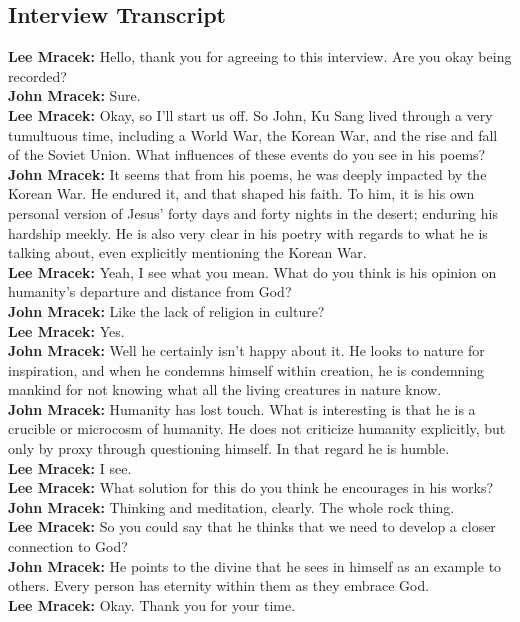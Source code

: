 \documentclass[12pt,letterpaper]{article}
\begin{document}
\begin{appendix}
    \section{Interview Transcript}
    \begin{subappendices}
\textbf{Lee Mracek:} Hello, thank you for agreeing to this interview. Are you okay being recorded? \\
\textbf{John Mracek:} Sure. \\
\textbf{Lee Mracek:} Okay, so I'll start us off. So John, Ku Sang lived through a very tumultuous time, including a World War, the Korean War, and the rise and fall of the Soviet Union. What influences of these events do you see in his poems?\\
\textbf{John Mracek:} It seems that from his poems, he was deeply impacted by the Korean War. He endured it, and that shaped his faith. To him, it is his own personal version of Jesus' forty days and forty nights in the desert; enduring his hardship meekly. He is also very clear in his poetry with regards to what he is talking about, even explicitly mentioning the Korean War.\\
\textbf{Lee Mracek:} Yeah, I see what you mean. What do you think is his opinion on humanity's departure and distance from God?\\
\textbf{John Mracek:} Like the lack of religion in culture? \\
\textbf{Lee Mracek:} Yes. \\
\textbf{John Mracek:} Well he certainly isn't happy about it. He looks to nature for inspiration, and when he condemns himself within creation, he is condemning mankind for not knowing what all the living creatures in nature know. \\
\textbf{John Mracek:} Humanity has lost touch. What is interesting is that he is a crucible or microcosm of humanity. He does not criticize humanity explicitly, but only by proxy through questioning himself. In that regard he is humble. \\
\textbf{Lee Mracek:} I see. \\
\textbf{Lee Mracek:} What solution for this do you think he encourages in his works? \\
\textbf{John Mracek:} Thinking and meditation, clearly. The whole rock thing. \\
\textbf{Lee Mracek:} So you could say that he thinks that we need to develop a closer connection to God? \\
\textbf{John Mracek:} He points to the divine that he sees in himself as an example to others. Every person has eternity within them as they embrace God.\\
\textbf{Lee Mracek:} Okay. Thank you for your time. \\
\end{subappendices}
\end{appendix}
\end{document}
